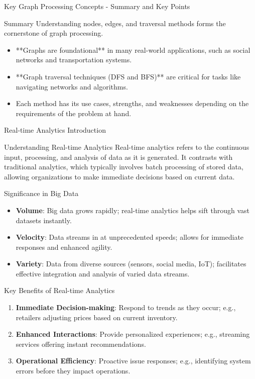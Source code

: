\documentclass[aspectratio=169]{beamer}
\begin{document}
\begin{frame}[fragile]{Key Graph Processing Concepts - Summary and Key Points}
    \begin{block}{Summary}
        Understanding nodes, edges, and traversal methods forms the cornerstone of graph processing.
    \end{block}
    
    \begin{itemize}
        \item **Graphs are foundational** in many real-world applications, such as social networks and transportation systems.
        \item **Graph traversal techniques (DFS and BFS)** are critical for tasks like navigating networks and algorithms.
        \item Each method has its use cases, strengths, and weaknesses depending on the requirements of the problem at hand.
    \end{itemize}
\end{frame}

\begin{frame}[fragile]{Real-time Analytics Introduction}
    \begin{block}{Understanding Real-time Analytics}
        Real-time analytics refers to the continuous input, processing, and analysis of data as it is generated. It contrasts with traditional analytics, which typically involves batch processing of stored data, allowing organizations to make immediate decisions based on current data.
    \end{block}
\end{frame}

\begin{frame}[fragile]{Significance in Big Data}
    \begin{itemize}
        \item \textbf{Volume}: Big data grows rapidly; real-time analytics helps sift through vast datasets instantly.
        \item \textbf{Velocity}: Data streams in at unprecedented speeds; allows for immediate responses and enhanced agility.
        \item \textbf{Variety}: Data from diverse sources (sensors, social media, IoT); facilitates effective integration and analysis of varied data streams.
    \end{itemize}
\end{frame}

\begin{frame}[fragile]{Key Benefits of Real-time Analytics}
    \begin{enumerate}
        \item \textbf{Immediate Decision-making}: Respond to trends as they occur; e.g., retailers adjusting prices based on current inventory.
        \item \textbf{Enhanced Interactions}: Provide personalized experiences; e.g., streaming services offering instant recommendations.
        \item \textbf{Operational Efficiency}: Proactive issue responses; e.g., identifying system errors before they impact operations.
    \end{enumerate}
\end{frame}
\end{document}

